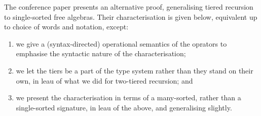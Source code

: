The conference paper \cite{dal-lago-et-al-2010} presents an alternative proof,
generalising tiered recursion to single-sorted free algebras. Their
characterisation is given below, equivalent up to choice of words and notation,
except:

\begin{enumerate}[label=(\arabic*)]

\item we give a (syntax-directed) operational semantics of the oprators to
emphasise the syntactic nature of the characterisation;

\item we let the tiers be a part of the type system rather than they stand on
their own, in leau of what we did for two-tiered recursion; and

\item we present the characterisation in terms of a many-sorted, rather than a
single-sorted signature, in leau of the above, and generalising slightly.

\end{enumerate}

